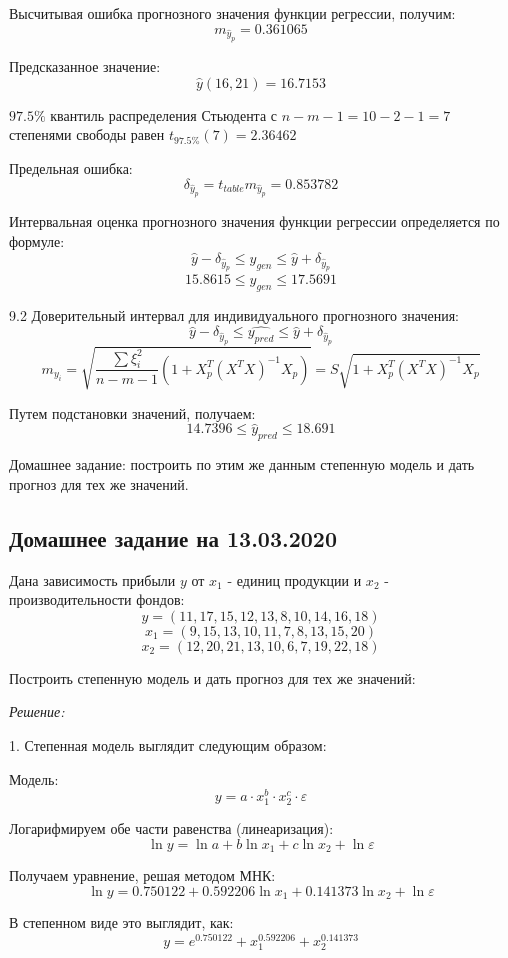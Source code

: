 \documentclass[aps,%
12pt,%
final,%
oneside,
onecolumn,%
musixtex, %
superscriptaddress,%
centertags]{article} %
\begin{document}
Высчитывая ошибка прогнозного значения функции регрессии, получим:
$$m_{\hat{y}_p} = 0.361065$$

Предсказанное значение:
$$\hat{y} (16,21)= 16.7153$$

$97.5\%$ квантиль распределения Стьюдента с $n-m-1 = 10 - 2 - 1 = 7$ степенями свободы равен $t_{97.5\%} (7) = 2.36462$

Предельная ошибка:
$$\delta_{\hat{y}_p} = t_{table} m_{\hat{y}_p} = 0.853782$$

Интервальная оценка прогнозного значения функции регрессии определяется по формуле:
$$\hat{y} - \delta_{\hat{y}_p} \leq \hat{y_{gen}} \leq \hat{y} + \delta_{\hat{y}_p}$$
$$15.8615 \leq \hat{y_{gen}} \leq 17.5691$$

9.2 Доверительный интервал для индивидуального прогнозного значения:
$$ \hat{y} - \delta_{\hat{y}_p} \leq \hat{y_{pred}} \leq \hat{y} + \delta_{\hat{y}_p}$$
$$m_{y_i}  = \sqrt{\frac{\sum \xi_i^2}{n-m-1} (1 + X_p^T(X^T X)^{-1}X_p)} = S  \sqrt {1 +X_p^T(X^T X)^{-1}X_p}$$

Путем подстановки значений, получаем:
$$14.7396 \leq \hat{y}_{pred} \leq 18.691$$

Домашнее задание: построить по этим же данным степенную модель и дать прогноз для тех же значений.

\subsection{Домашнее задание на 13.03.2020}

Дана зависимость прибыли $y$ от $x_1$ - единиц продукции и $x_2$ - производительности фондов:
$$y = (11, 17, 15, 12, 13, 8, 10, 14, 16, 18)$$
$$x_1 =(9, 15, 13, 10, 11, 7, 8, 13, 15, 20)$$
$$x_2 = (12, 20, 21, 13, 10, 6, 7, 19, 22, 18)$$

Построить степенную модель и дать прогноз для тех же значений:

\textit{Решение:}

1. Степенная модель выглядит следующим образом:

Модель:
$$ y = a \cdot x_1^b \cdot x_2^c\cdot \varepsilon $$

Логарифмируем обе части равенства (линеаризация):
$$ \ln y =\ln a + b\ln x_1 + c\ln x_2 + \ln \varepsilon $$

Получаем уравнение, решая методом МНК:
$$ \ln y = 0.750122 + 0.592206\ln x_1 + 0.141373\ln x_2 + \ln \varepsilon $$

В степенном виде это выглядит, как:
$$y = e^{0.750122} + x_1^{0.592206} + x_2^{ 0.141373}$$
\end{document}
